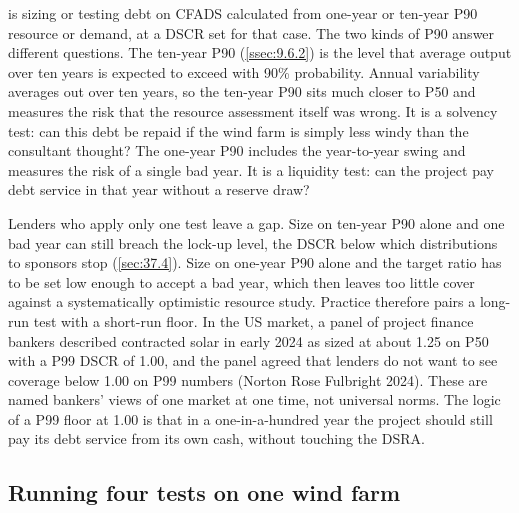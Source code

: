  is sizing or testing debt on CFADS calculated from one-year or ten-year P90 resource or demand, at a DSCR set for that case. The two kinds of P90 answer different questions. The ten-year P90 (\cref{ssec:9.6.2}) is the level that average output over ten years is expected to exceed with 90\% probability. Annual variability averages out over ten years, so the ten-year P90 sits much closer to P50 and measures the risk that the resource assessment itself was wrong. It is a solvency test: can this debt be repaid if the wind farm is simply less windy than the consultant thought? The one-year P90 includes the year-to-year swing and measures the risk of a single bad year. It is a liquidity test: can the project pay debt service in that year without a reserve draw?

Lenders who apply only one test leave a gap. Size on ten-year P90 alone and one bad year can still breach the lock-up level, the DSCR below which distributions to sponsors stop (\cref{sec:37.4}). Size on one-year P90 alone and the target ratio has to be set low enough to accept a bad year, which then leaves too little cover against a systematically optimistic resource study. Practice therefore pairs a long-run test with a short-run floor. In the US market, a panel of project finance bankers described contracted solar in early 2024 as sized at about 1.25\x{} on P50 with a P99 DSCR of 1.00\x, and the panel agreed that lenders do not want to see coverage below 1.00\x{} on P99 numbers (Norton Rose Fulbright 2024). These are named bankers' views of one market at one time, not universal norms. The logic of a P99 floor at 1.00\x{} is that in a one-in-a-hundred year the project should still pay its debt service from its own cash, without touching the DSRA.

\subsection{Running four tests on one wind farm}\label{ssec:36.4.2}


